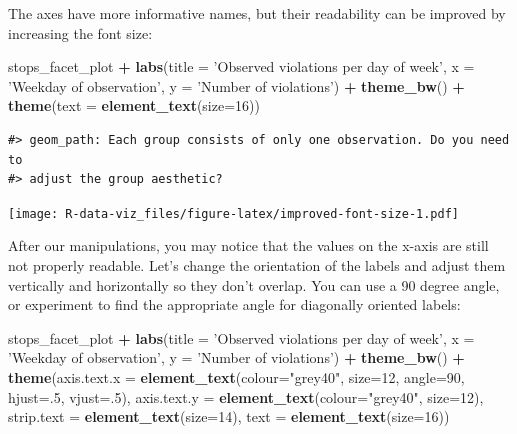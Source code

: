\documentclass[]{book}
\newenvironment{Shaded}{\begin{snugshade}}{\end{snugshade}}
\newcommand{\KeywordTok}[1]{\textcolor[rgb]{0.13,0.29,0.53}{\textbf{#1}}}
\newcommand{\DataTypeTok}[1]{\textcolor[rgb]{0.13,0.29,0.53}{#1}}
\newcommand{\DecValTok}[1]{\textcolor[rgb]{0.00,0.00,0.81}{#1}}
\newcommand{\StringTok}[1]{\textcolor[rgb]{0.31,0.60,0.02}{#1}}
\newcommand{\OperatorTok}[1]{\textcolor[rgb]{0.81,0.36,0.00}{\textbf{#1}}}
\newcommand{\NormalTok}[1]{#1}
\theoremstyle{definition}
\theoremstyle{definition}
\theoremstyle{definition}
\theoremstyle{remark}
\begin{document}
The axes have more informative names, but their readability can be
improved by increasing the font size:

\begin{Shaded}
\begin{Highlighting}[]
\NormalTok{stops_facet_plot }\OperatorTok{+}
\StringTok{  }\KeywordTok{labs}\NormalTok{(}\DataTypeTok{title =} \StringTok{'Observed violations per day of week'}\NormalTok{,}
         \DataTypeTok{x =} \StringTok{'Weekday of observation'}\NormalTok{,}
         \DataTypeTok{y =} \StringTok{'Number of violations'}\NormalTok{) }\OperatorTok{+}
\StringTok{  }\KeywordTok{theme_bw}\NormalTok{() }\OperatorTok{+}\StringTok{ }
\StringTok{  }\KeywordTok{theme}\NormalTok{(}\DataTypeTok{text =} \KeywordTok{element_text}\NormalTok{(}\DataTypeTok{size=}\DecValTok{16}\NormalTok{))}
\end{Highlighting}
\end{Shaded}

\begin{verbatim}
#> geom_path: Each group consists of only one observation. Do you need to
#> adjust the group aesthetic?
\end{verbatim}

\texttt{[image: R-data-viz\_files/figure-latex/improved-font-size-1.pdf]}

After our manipulations, you may notice that the values on the x-axis
are still not properly readable. Let's change the orientation of the
labels and adjust them vertically and horizontally so they don't
overlap. You can use a 90 degree angle, or experiment to find the
appropriate angle for diagonally oriented labels:

\begin{Shaded}
\begin{Highlighting}[]
\NormalTok{stops_facet_plot }\OperatorTok{+}
\StringTok{  }\KeywordTok{labs}\NormalTok{(}\DataTypeTok{title =} \StringTok{'Observed violations per day of week'}\NormalTok{,}
         \DataTypeTok{x =} \StringTok{'Weekday of observation'}\NormalTok{,}
         \DataTypeTok{y =} \StringTok{'Number of violations'}\NormalTok{) }\OperatorTok{+}
\StringTok{  }\KeywordTok{theme_bw}\NormalTok{() }\OperatorTok{+}\StringTok{ }
\StringTok{  }\KeywordTok{theme}\NormalTok{(}\DataTypeTok{axis.text.x =} \KeywordTok{element_text}\NormalTok{(}\DataTypeTok{colour=}\StringTok{"grey40"}\NormalTok{, }\DataTypeTok{size=}\DecValTok{12}\NormalTok{, }\DataTypeTok{angle=}\DecValTok{90}\NormalTok{, }\DataTypeTok{hjust=}\NormalTok{.}\DecValTok{5}\NormalTok{, }\DataTypeTok{vjust=}\NormalTok{.}\DecValTok{5}\NormalTok{),}
        \DataTypeTok{axis.text.y =} \KeywordTok{element_text}\NormalTok{(}\DataTypeTok{colour=}\StringTok{"grey40"}\NormalTok{, }\DataTypeTok{size=}\DecValTok{12}\NormalTok{),}
        \DataTypeTok{strip.text =} \KeywordTok{element_text}\NormalTok{(}\DataTypeTok{size=}\DecValTok{14}\NormalTok{),}
        \DataTypeTok{text =} \KeywordTok{element_text}\NormalTok{(}\DataTypeTok{size=}\DecValTok{16}\NormalTok{))}
\end{Highlighting}
\end{Shaded}
\end{document}
